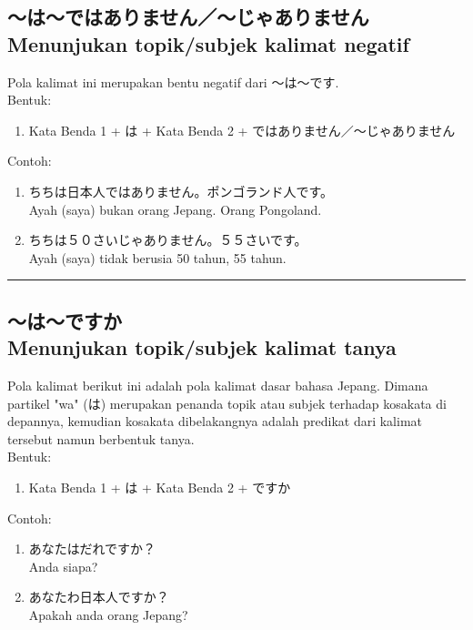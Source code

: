 \subsection*{
    ～は～ではありません／～じゃありません \\
    Menunjukan topik/subjek kalimat negatif
}
Pola kalimat ini merupakan bentu negatif dari ～は～です.\\
Bentuk:
\begin{enumerate}
    \item Kata Benda 1 + は + Kata Benda 2 + ではありません／～じゃありません
\end{enumerate}
Contoh: 
\begin{enumerate}
    \item ちちは日本人ではありません。ポンゴランド人です。
    \\ Ayah (saya) bukan orang Jepang. Orang Pongoland.
    \item ちちは５０さいじゃありません。５５さいです。
    \\ Ayah (saya) tidak berusia 50 tahun, 55 tahun.
\end{enumerate}

\vspace{0.2cm}\hrule height 1pt\vspace{0.2cm}

\newpage
\subsection*{
    ～は～ですか \\
    Menunjukan topik/subjek kalimat tanya
}
Pola kalimat berikut ini adalah pola kalimat dasar bahasa Jepang.
Dimana partikel "wa" (は) merupakan penanda topik atau subjek terhadap 
kosakata di depannya, kemudian kosakata dibelakangnya adalah predikat 
dari kalimat tersebut namun berbentuk tanya.\\
Bentuk:
\begin{enumerate}
    \item Kata Benda 1 + は + Kata Benda 2 + ですか
\end{enumerate}
Contoh: 
\begin{enumerate}
    \item あなたはだれですか？
    \\ Anda siapa?
    \item あなたわ日本人ですか？
    \\ Apakah anda orang Jepang?
\end{enumerate}

